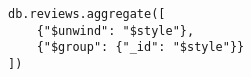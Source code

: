 \begin{verbatim}
db.reviews.aggregate([
    {"$unwind": "$style"},
    {"$group": {"_id": "$style"}}
])
\end{verbatim}